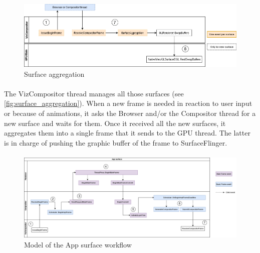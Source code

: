 \documentclass{kththesis}
\begin{document}
\begin{figure}[h]
    \centering
    \includegraphics[width=\linewidth]{kththesis/Figures/Surface_aggregation.png}
    \caption{Surface aggregation}
    \label{fig:surface_aggregation}
\end{figure}

\paragraph{}
The VizCompositor thread manages all those surfaces (see \autoref{fig:surface_aggregation}). When a new frame is needed in reaction to user input or because of animations, it asks the Browser and/or the Compositor thread for a new surface and waits for them. Once it received all the new surfaces, it aggregates them into a single frame that it sends to the GPU thread. The latter is in charge of pushing the graphic buffer of the frame to SurfaceFlinger. 

\paragraph{}

\begin{figure}
    \centering
    \includegraphics[width=\linewidth]{kththesis/Figures/App_surface.png}
    \caption{Model of the App surface workflow}
    \label{fig:app_surface}
\end{figure}
\end{document}
